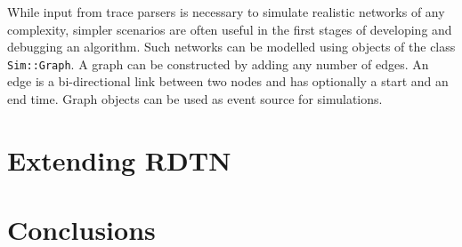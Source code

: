 \documentclass{article}
\begin{document}
While input from trace parsers is necessary to simulate realistic networks of
any complexity, simpler scenarios are often useful in the first stages of
developing and debugging an algorithm. Such networks can be modelled using
objects of the class {\tt Sim::Graph}. A graph can be constructed by adding any
number of edges. An edge is a bi-directional link between two nodes and has
optionally a start and an end time. Graph objects can be used as event source
for simulations.

\section{Extending RDTN}\label{sec.extending}

\section{Conclusions}\label{sec.conclusions}

%
\end{document}
